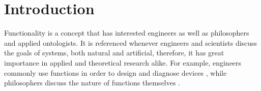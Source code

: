 \documentclass[sw]{iosart2x}
\begin{document}


\section{Introduction}\label{sec:intro}

Functionality is a concept that has interested engineers as well as philosophers and applied ontologists. 
It is referenced whenever engineers and scientists discuss the goals of systems, both natural and artificial, therefore, it has great importance in applied and theoretical research alike. 
For example, engineers commonly use functions in order to design \cite{pahl_engineering_2007} and diagnose devices \cite{larssonDiagnosisBasedExplicit1996}, while philosophers discuss the nature of functions themselves \cite{cumminsFunctionalAnalysis1975}.
\end{document}
